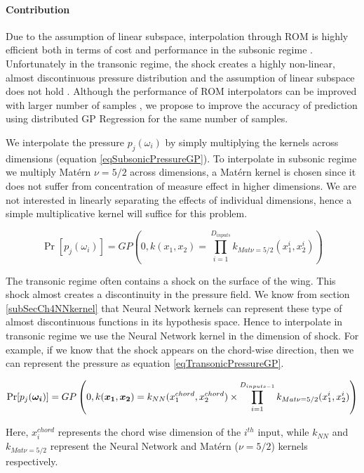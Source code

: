 \begin{mdframed}[hidealllines=true,backgroundcolor=blue!20]
\paragraph{Contribution}
Due to the assumption of linear subspace, interpolation through ROM is highly efficient both in terms of cost and performance in the subsonic regime \cite{verveld2016reduced}. Unfortunately in the transonic regime, the shock creates a highly non-linear, almost discontinuous pressure distribution and the assumption of linear subspace does not hold \cite{li2016performance}. Although the performance of ROM interpolators can be improved with larger number of samples \cite{franz2014interpolation, forrester2008engineering}, we propose to improve the accuracy of prediction using distributed GP Regression for the same number of samples.  

We interpolate the pressure $p_{j}(\omega_{i})$ by simply multiplying the kernels across dimensions (equation \ref{eqSubsonicPressureGP}). To interpolate in subsonic regime we multiply Mat\'ern $\nu=5/2$ across dimensions, a Mat\'ern kernel is chosen since it does not suffer from concentration of measure effect in higher dimensions. We are not interested in linearly separating the effects of individual dimensions, hence a simple multiplicative kernel will suffice for this problem. 

\begin{equation}\label{eqSubsonicPressureGP}
\Pr[p_{j}(\omega_{i})] = GP \left( 0, k(x_{1}, x_{2}) = \prod_{i=1}^{D_{inputs}} k_{Mat \nu =5/2}(x_{1}^{i}, x_{2}^{i}) \right)
\end{equation}

The transonic regime often contains a shock on the surface of the wing. This shock almost creates a discontinuity in the pressure field. We know from section \ref{subSecCh4NNkernel} that Neural Network kernels can represent these type of almost discontinuous functions in its hypothesis space. Hence to interpolate in transonic regime we use the Neural Network kernel in the dimension of shock. For example, if we know that the shock appears on the chord-wise direction, then we can represent the pressure as equation \ref{eqTransonicPressureGP}.

\begin{equation}\label{eqTransonicPressureGP}
\Pr[p_{j}(\boldsymbol{\omega_{i}})] = GP \left( 0, k(\boldsymbol{x_{1}}, \boldsymbol{x_{2}}) = k_{NN}(x_{1}^{chord}, x_{2}^{chord}) \times \prod_{i=1}^{D_{inputs-1}} k_{Mat \nu =5/2}(x_{1}^{i}, x_{2}^{i}) \right)
\end{equation}

Here, $x_i^{chord}$ represents the chord wise dimension of the $i^{th}$ input, while $k_{NN}$ and $k_{Mat \nu =5/2}$ represent the Neural Network and Mat\'ern ($\nu=5/2$) kernels respectively.
\end{mdframed}

